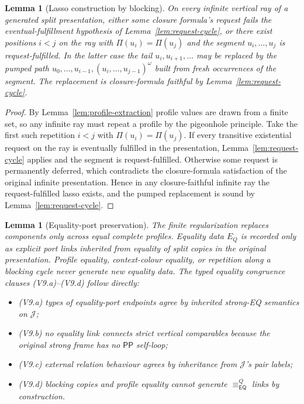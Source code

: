 \documentclass[11pt]{article}
\newtheorem{lemma}[theorem]{Lemma}
\newcommand{\EQ}{\mathsf{EQ}}
\newcommand{\PP}{\mathsf{PP}}
\newcommand{\J}{\mathcal J}
\newcommand{\eqc}{\equiv_{\EQ}}
\begin{document}
\begin{lemma}[Lasso construction by blocking]\label{lem:lasso}
On every infinite vertical ray of a generated split presentation,
either some closure formula's request fails the eventual-fulfillment
hypothesis of Lemma~\ref{lem:request-cycle}, or there exist
positions $i<j$ on the ray with $\Pi(u_i)=\Pi(u_j)$ and the segment
$u_i,\ldots,u_j$ is request-fulfilled.  In the latter case the tail
$u_i,u_{i+1},\ldots$ may be replaced by the pumped path
$u_0,\ldots,u_{i-1},(u_i,\ldots,u_{j-1})^\omega$ built from fresh
occurrences of the segment.  The replacement is closure-formula
faithful by Lemma~\ref{lem:request-cycle}.
\end{lemma}

\begin{proof}
By Lemma~\ref{lem:profile-extraction} profile values are drawn from
a finite set, so any infinite ray must repeat a profile by the
pigeonhole principle.  Take the first such repetition $i<j$ with
$\Pi(u_i)=\Pi(u_j)$.  If every transitive existential request on the
ray is eventually fulfilled in the presentation,
Lemma~\ref{lem:request-cycle} applies and the segment is
request-fulfilled.  Otherwise some request is permanently deferred,
which contradicts the closure-formula satisfaction of the original
infinite presentation.  Hence in any closure-faithful infinite ray
the request-fulfilled lasso exists, and the pumped replacement is
sound by Lemma~\ref{lem:request-cycle}.
\end{proof}

\begin{lemma}[Equality-port preservation]\label{lem:eq-port-preservation}
The finite regularization replaces components only across equal
complete profiles.  Equality data $E_Q$ is recorded only as
explicit port links inherited from equality of split copies in the
original presentation.  Profile equality, context-colour equality,
or repetition along a blocking cycle never generate new equality
data.  The typed equality congruence clauses (V9.a)--(V9.d) follow
directly:
\begin{itemize}
\item (V9.a) types of equality-port endpoints agree by inherited
strong-EQ semantics on $\J$;
\item (V9.b) no equality link connects strict vertical comparables
because the original strong frame has no $\PP$ self-loop;
\item (V9.c) external relation behaviour agrees by inheritance from
$\J$'s pair labels;
\item (V9.d) blocking copies and profile equality cannot generate
$\eqc^Q$ links by construction.
\end{itemize}
\end{lemma}
\end{document}

